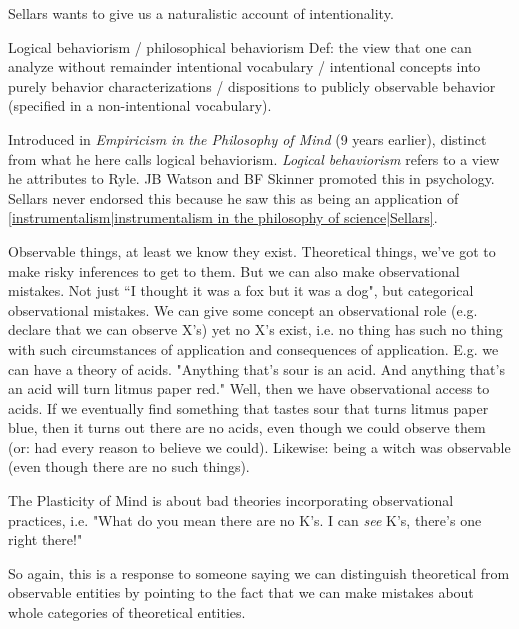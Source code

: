 Sellars wants to give us a naturalistic account of intentionality.

Logical behaviorism / philosophical behaviorism
Def: the view that one can analyze without remainder intentional vocabulary / intentional concepts into purely behavior characterizations / dispositions to publicly observable behavior (specified in a non-intentional vocabulary).

Introduced in \emph{Empiricism in the Philosophy of Mind} (9 years earlier), distinct from what he here calls logical behaviorism. \emph{Logical behaviorism} refers to a view he attributes to Ryle. JB Watson and BF Skinner promoted this in psychology. Sellars never endorsed this because he saw this as being an application of \ref{instrumentalism|instrumentalism in the philosophy of science|Sellars}.

Observable things, at least we know they exist. Theoretical things, we've got to make risky inferences to get to them. But we can also make observational mistakes. Not just ``I thought it was a fox but it was a dog", but categorical observational mistakes. We can give some concept an observational role (e.g. declare that we can observe X's) yet no X's exist, i.e. no thing has such no thing with such circumstances of application and consequences of application. E.g. we can have a theory of acids. "Anything that's sour is an acid. And anything that's an acid will turn litmus paper red." Well, then we have observational access to acids. If we eventually find something that tastes sour that turns litmus paper blue, then it turns out there are no acids, even though we could observe them (or: had every reason to believe we could). Likewise: being a witch was observable (even though there are no such things).

The Plasticity of Mind is about bad theories incorporating observational practices, i.e. "What do you mean there are no K's. I can \emph{see} K's, there's one right there!"

So again, this is a response to someone saying we can distinguish theoretical from observable entities by pointing to the fact that we can make mistakes about whole categories of theoretical entities.


